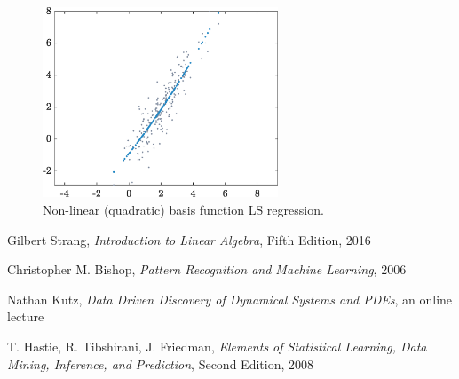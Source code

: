 \documentclass[10pt,twocolumn]{article}
\begin{document}
\begin{figure}[H]
\centering\includegraphics[width=7cm]{LS-nonlinear-basis-functions.eps}
\caption{Non-linear (quadratic) basis function LS regression.}
\label{fig:LS-linear-basis}
\end{figure}











\newpage


\thebibliography{}



 Gilbert Strang, \textit{Introduction to Linear Algebra}, Fifth Edition, 2016

 Christopher M. Bishop, \textit{Pattern Recognition and Machine Learning}, 2006

 Nathan Kutz, \textit{Data Driven Discovery of Dynamical Systems and PDEs}, an online lecture 

 T. Hastie, R. Tibshirani, J. Friedman, \textit{Elements of Statistical Learning, Data Mining, Inference, and Prediction}, Second Edition, 2008

 \label{bib:pope}
\end{document}
